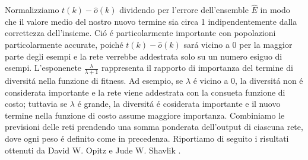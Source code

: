 \documentclass[a4paper,12pt]{report}
\begin{document}
  Normalizziamo $t(k) - \widehat{o} (k)$ dividendo per l'errore dell'ensemble $\widehat{E}$ in modo che il valore medio del nostro nuovo termine sia circa 1 indipendentemente dalla correttezza dell'insieme. 
  Ci\'o \'e particolarmente importante con popolazioni particolarmente accurate, poich\'e $t(k) - \widehat{o} (k)$ sar\'a vicino a 0 per la maggior parte degli esempi e la rete verrebbe addestrata solo su un numero esiguo di esempi. 
  L'esponenete $\frac{\lambda}{\lambda + 1}$ rappresenta il rapporto di importanza del termine di diversit\'a nella funzione di fitness. 
  Ad esempio, se $\lambda$ \'e vicino a 0, la diversit\'a non \'e considerata importante e la rete viene addestrata con la consueta funzione di costo; tuttavia se $\lambda$ \'e grande, la diversit\'a \'e cosiderata importante e il nuovo termine nella funzione di costo assume maggiore importanza. 
  Combiniamo le previsioni delle reti prendendo una somma ponderata dell'output di ciascuna rete, dove ogni peso \'e definito come in precedenza. Riportiamo di seguito i risultati ottenuti da David W. Opitz e Jude W. Shavlik \cite{opitz1994using}.
  
\end{document}
